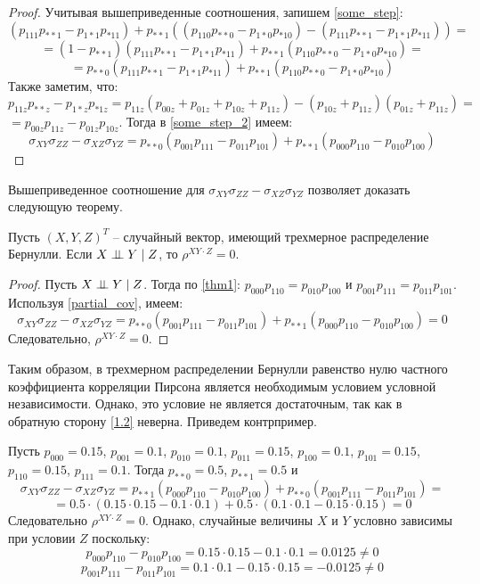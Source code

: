 \begin{proof}
    Учитывая вышеприведенные соотношения, запишем \eqref{some_step}:
    $$
    (p_{111}p_{**1}-p_{1*1}p_{*11})+p_{**1}((p_{110}p_{**0}-p_{1*0}p_{*10})-(p_{111}p_{**1}-p_{1*1}p_{*11}))=
    $$
    $$
        =(1-p_{**1})(p_{111}p_{**1}-p_{1*1}p_{*11})+p_{**1}(p_{110}p_{**0}-p_{1*0}p_{*10})=
    $$
    \begin{equation}\label{some_step_2}
        =p_{**0}(p_{111}p_{**1}-p_{1*1}p_{*11})+p_{**1}(p_{110}p_{**0}-p_{1*0}p_{*10})
    \end{equation}
    Также заметим, что:\\
    $
        p_{11z}p_{**z}-p_{1*z}p_{*1z} = p_{11z}(p_{00z}+p_{01z}+p_{10z}+p_{11z})-
        (p_{10z}+p_{11z})(p_{01z}+p_{11z})=
    $
    $
        = p_{00z}p_{11z}-p_{01z}p_{10z}
    $.
    Тогда в \eqref{some_step_2} имеем:
    $$
    \sigma_{XY} \sigma_{ZZ} - \sigma_{XZ} \sigma_{YZ} = p_{**0}(p_{001}p_{111}-p_{011}p_{101}) + p_{**1} (p_{000}p_{110}-p_{010}p_{100})
    $$
\end{proof}
Вышеприведенное соотношение для $\sigma_{XY} \sigma_{ZZ} - \sigma_{XZ} \sigma_{YZ}$ позволяет доказать следующую теорему.
\begin{theorem}\label{1.2}
    Пусть $(X,Y,Z)^T$ -- случайный вектор, имеющий трехмерное распределение Бернулли.
    Если $X \perp\!\!\!\perp Y \mid Z$, то $\rho^{XY \cdot Z}=0$.
\end{theorem}
\begin{proof}
    Пусть $X \perp\!\!\!\perp Y \mid Z$. Тогда по \autoref{thm1}:
    $p_{000}p_{110}=p_{010}p_{100}$ и 
    $p_{001}p_{111}=p_{011}p_{101}$.
    Используя \autoref{partial_cov}, имеем:
    $$
    \sigma_{XY} \sigma_{ZZ} - \sigma_{XZ} \sigma_{YZ}=p_{**0}(p_{001}p_{111}-p_{011}p_{101}) + p_{**1} (p_{000}p_{110}-p_{010}p_{100})= 0
    $$
    Следовательно, $\rho^{XY \cdot Z}=0$.
\end{proof}
Таким образом, в трехмерном распределении Бернулли
равенство нулю частного коэффициента корреляции Пирсона является необходимым условием условной независимости.
Однако, это условие не является достаточным, так как в обратную сторону \autoref{1.2} неверна. Приведем контрпример.
\begin{example}
    Пусть $p_{000}=0.15$, $p_{001}=0.1$, $p_{010}=0.1$, $p_{011}=0.15$, $p_{100}=0.1$, $p_{101}=0.15$, $p_{110}=0.15$, $p_{111}=0.1$.
    Тогда $p_{**0}=0.5$, $p_{**1}=0.5$ и
    $$\sigma_{XY} \sigma_{ZZ} - \sigma_{XZ} \sigma_{YZ} = p_{**1}(p_{000}p_{110}-p_{010}p_{100}) + p_{**0}(p_{001}p_{111}-p_{011}p_{101})=$$
    $$=0.5 \cdot (0.15 \cdot 0.15 - 0.1 \cdot 0.1) + 0.5 \cdot (0.1 \cdot 0.1 - 0.15 \cdot 0.15) = 0$$
    Следовательно $\rho^{XY\cdot Z}=0$.
    Однако, случайные величины $X$ и $Y$ условно зависимы при условии $Z$ поскольку:
    $$
        p_{000}p_{110}-p_{010}p_{100}=0.15 \cdot 0.15 - 0.1 \cdot 0.1 = 0.0125 \neq 0
    $$
    $$
        p_{001}p_{111}-p_{011}p_{101}=0.1 \cdot 0.1 - 0.15 \cdot 0.15 = -0.0125 \neq 0
    $$
\end{example}
